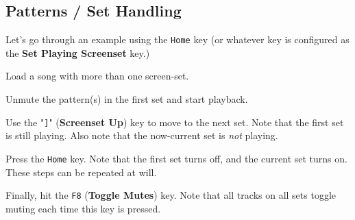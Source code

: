 \subsection{Patterns / Set Handling}
\label{subsec:patterns_panel_set_handling}

   Let's go through an example using the \texttt{Home} key (or whatever key is
   configured as the \textbf{Set Playing Screenset} key.)

   \begin{enumber}
      \item Load a song with more than one screen-set.
      \item Unmute the pattern(s) in the first set and start playback.
      \item Use the "\texttt{]}" (\textbf{Screenset Up}) key to move to the next
         set.  Note that the first set is still playing.  Also note that the
         now-current set is \textsl{not} playing.
      \item Press the \texttt{Home} key.
         Note that the first set turns off, and the current set turns on.
         These steps can be repeated at will.
      \item Finally, hit the \texttt{F8} (\textbf{Toggle Mutes}) key.
         Note that all tracks on all sets toggle muting each time this key is
         pressed.
   \end{enumber}

